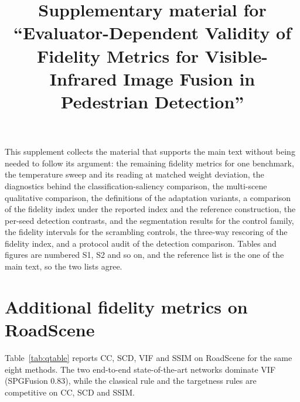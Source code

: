 \documentclass[preprint,12pt,a4paper]{elsarticle}
\begin{document}
\begin{frontmatter}

\title{Supplementary material for ``Evaluator-Dependent Validity of Fidelity Metrics
for Visible-Infrared Image Fusion in Pedestrian Detection''}

\end{frontmatter}

This supplement collects the material that supports the main text without being
needed to follow its argument: the remaining fidelity metrics for one benchmark,
the temperature sweep and its reading at matched weight deviation, the diagnostics
behind the classification-saliency comparison, the multi-scene qualitative
comparison, the definitions of the adaptation variants, a comparison of the
fidelity index under the reported index and the reference construction, the per-seed
detection contrasts, and
the segmentation results for the control family, the fidelity intervals for the
scrambling controls, the three-way rescoring of the fidelity index, and a protocol
audit of the detection comparison. Tables and figures are numbered
S1, S2 and so on, and the reference list is the one of the main text, so the two
lists agree.

\section{Additional fidelity metrics on RoadScene}

Table~\ref{tab:qtable} reports CC, SCD, VIF and SSIM on RoadScene for the same
eight methods. The two end-to-end state-of-the-art networks dominate VIF
(SPGFusion 0.83), while the classical rule and the targetness rules are
competitive on CC, SCD and SSIM.
\end{document}
